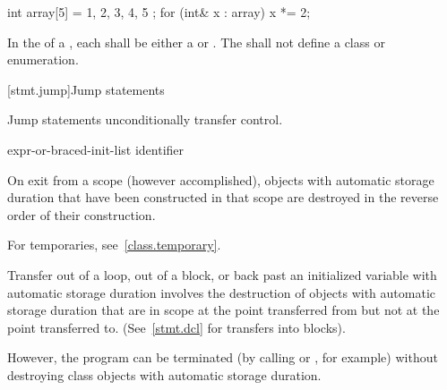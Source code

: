 \begin{example}
\begin{codeblock}
int array[5] = { 1, 2, 3, 4, 5 };
for (int& x : array)
  x *= 2;
\end{codeblock}
\end{example}

\pnum
In the  of a ,
each  shall be either a 
or . The  shall not define a
class or enumeration.%

[stmt.jump]{Jump statements}%

\pnum
Jump statements unconditionally transfer control.
%

%
%
%
%
%
%
\begin{bnf}
\br
    \br
    \br
     expr-or-braced-init-list\opt{} \terminal{;}\br
     identifier \terminal{;}
\end{bnf}

\pnum
{}%
%
On exit from a scope (however accomplished), objects with automatic storage
duration that have been constructed in that scope are destroyed
in the reverse order of their construction. \begin{note} For temporaries,
see~\ref{class.temporary}. \end{note} Transfer out of a loop, out of a block, or back
past
an initialized variable with automatic storage duration involves the
destruction of objects with automatic storage duration that are in
scope at the point transferred from but not at the point transferred to.
(See~\ref{stmt.dcl} for transfers into blocks).
\begin{note}
However, the program can be terminated (by calling
%
%
 or
%
%
, for example) without
destroying class objects with automatic storage duration.
\end{note}

